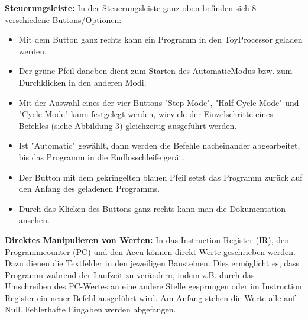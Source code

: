 \documentclass{article}
\begin{document}
\noindent \textbf{Steuerungsleiste:} In der Steuerungsleiste ganz oben befinden sich 8 verschiedene
Buttons/Optionen:
\begin{itemize}
    \item   Mit dem Button ganz rechts kann ein Programm in den ToyProcessor geladen werden.
    \item   Der grüne Pfeil daneben dient zum Starten des AutomaticModus bzw. zum Durchklicken in den anderen Modi.
    \item   Mit der Auswahl eines der vier Buttons "Step-Mode", "Half-Cycle-Mode" und "Cycle-Mode" kann festgelegt werden, wieviele
            der Einzelschritte eines Befehles (siehe Abbildung 3) gleichzeitig ausgeführt werden.
    \item   Ist "Automatic" gewählt, dann werden die Befehle nacheinander abgearbeitet, bis das Programm in die Endlosschleife gerät.
    \item   Der Button mit dem gekringelten blauen Pfeil setzt das Programm zurück auf den Anfang des geladenen Programms.
    \item   Durch das Klicken des Buttons ganz rechts kann man die Dokumentation ansehen.
\end{itemize}

\noindent \textbf{Direktes Manipulieren von Werten:}
In das Instruction Register (IR), den Programmcounter (PC) und den Accu können direkt Werte geschrieben werden. Dazu dienen die Textfelder in den jeweiligen Bausteinen.  Dies ermöglicht es, dass Programm
während der Laufzeit zu verändern, indem z.B. durch das Umschreiben des PC-Wertes an eine andere Stelle gesprungen oder im Instruction Register ein
neuer Befehl ausgeführt wird. Am Anfang stehen die Werte alle auf Null. Fehlerhafte Eingaben werden abgefangen.\\

\newpage
\end{document}
